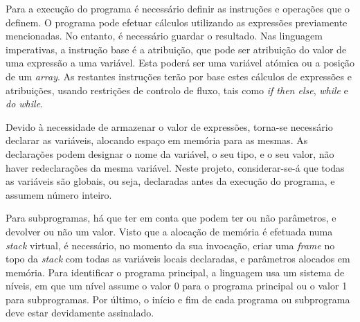 Para a execução do programa é necessário definir as instruções e operações que
o definem. O programa pode efetuar cálculos utilizando as expressões previamente
mencionadas. No entanto, é necessário guardar o resultado. Nas linguagem
imperativas, a instrução base é a atribuição, que pode ser atribuição do valor
de uma expressão a uma variável. Esta poderá ser uma variável atómica ou
a posição de um \emph{array}.  As restantes instruções terão por base estes
cálculos de expressões e atribuições, usando restrições de controlo de fluxo,
tais como \emph{if then else}, \emph{while} e \emph{do while}.

Devido à necessidade de armazenar o valor de expressões, torna-se necessário 
declarar as variáveis, alocando espaço em memória para as mesmas. As declarações 
podem designar o nome da variável, o seu tipo, e o seu valor, não haver redeclarações 
da mesma variável. Neste projeto, considerar-se-á que todas as variáveis são globais, 
ou seja, declaradas antes da execução do programa, e assumem número inteiro.   

Para subprogramas, há que ter em conta que podem ter ou não parâmetros,
e devolver ou não um valor. Visto que a alocação de memória é efetuada numa
\emph{stack} virtual, é necessário, no momento da sua invocação, criar uma \emph{frame}
no topo da \emph{stack} com todas as variáveis locais declaradas, e parâmetros
alocados em memória. Para identificar o programa principal, a linguagem usa um
sistema de níveis, em que um nível assume o valor 0 para o programa principal ou
o valor 1 para subprogramas. Por último, o início e fim de cada programa ou
subprograma deve estar devidamente assinalado.  




